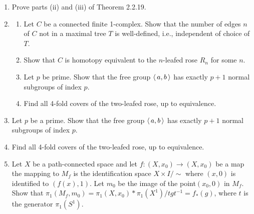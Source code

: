 \documentclass[12pt,a4paper]{report}
\newcommand{\BLUE}[1]{\textcolor{blue}{#1}}
\newcommand{\FUNDG}[1]{\pi_1(#1)}
\begin{document}
\begin{enumerate}[label=2.7.\arabic*]
\textbf{Notes:} Doesn't $X_1$ path-connected and $X_2$ path-connected implie $X_1 \cap X_2$ path-connected?  Perhaps that is just redundancy or clarity.  Given this info, show that if $X_1$ and $X_2$ are also simply connected, then $X = X_1\cup X_2$ must also be simply connected.  We need to find a single point where the Fundamental Group $(X, x_0)$ is trivial.

\BLUE{Let $x_0 \in A$.  $A$ is path-connected means $A \ne \emptyset$ and that for any point $x_1$ there exists a continuous function $\varphi: I \to A$ such that $\varphi(0) = x_0$ and $\varphi(1) = x_1$.  Let $\phi: I \to A$ such that $\phi(0) = x_1$ and $\phi(1)=x_0$ and $\phi \ne \varphi^{-1}$.  Then $h=\varphi\phi \in S^1$.  As $x_1 \to x_0$ we can see that $h \to x_0$ for all possible $\varphi$ and $\phi$.  \textit{Note: perhaps a proof by contradiction might be in order.}
}

\item Prove parts (ii) and (iii) of Theorem 2.2.19.

\item \begin{enumerate}
	\item Let $C$ be a connected finite 1-complex.  Show that the number of edges $n$ of $C$ not in a maximal tree $T$ is well-defined, i.e., independent of choice of $T$.
	\item Show that $C$ is homotopy equivalent to the $n$-leafed rose $R_n$ for some $n$.
	
	\item Let $p$ be prime.  Show that the free group $\left \langle\, a,b \,\right \rangle$ has exactly $p+1$ normal subgroups of index $p$.
	
	\item Find all 4-fold covers of the two-leafed rose, up to equivalence.
\end{enumerate}

	\item Let $p$ be a prime.  Show that the free group $\left \langle\, a,b \,\right \rangle$ has exactly $p+1$ normal subgroups of index $p$.
	
	\item Find all 4-fold covers of the two-leafed rose, up to equivalence.
	
	\item Let $X$ be a path-connected space and let $f:(X,x_0)\to(X, x_0)$ be a map the mapping to $M_f$ is the identification space $X \times I/\sim$ where $(x,0)$ is identified to $(f(x),1)$.  Let $m_0$ be the image of the point$(x_0,0)$ in $M_f$.  Show that $\pi_1(M_f,m_0)=\pi_1(X,x_0) * \FUNDG{X^1}/tgt^{-1}=f_*(g)$, where $t$ is the generator $\pi_1(S^1)$.
	

\end{enumerate}
\end{document}
